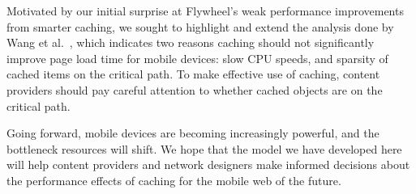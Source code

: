 
Motivated by our initial surprise at Flywheel's weak performance improvements
from smarter caching, we sought to highlight and extend the analysis done by
Wang et al.~\cite{wang2013demystifying}, which indicates two reasons caching
should not
significantly improve page load time for mobile devices: slow CPU
speeds, and sparsity of cached items on the critical
path.
To make effective use of caching, content providers should pay careful
attention to whether cached objects are on the critical path.


Going forward, mobile devices are becoming increasingly powerful, and the
bottleneck resources will shift. We hope that the model we have developed here
will help content providers and network designers make informed decisions about the performance
effects of caching for the mobile web of the future.
%
%

